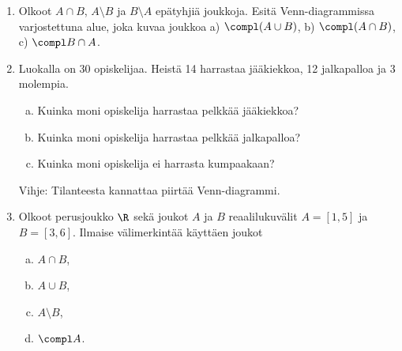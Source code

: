 \begin{enumerate}
%
%
%
%

\item
Olkoot $A \cap B$, $A \setminus B$ ja $B \setminus A$ epätyhjiä joukkoja. Esitä Venn-diagrammissa varjostettuna alue, joka kuvaa joukkoa a) $\compl (A \cup B)$, b) $\compl (A \cap B)$, c) $\compl B \cap A$.

\item Luokalla on 30 opiskelijaa. Heistä 14 harrastaa jääkiekkoa, 12 jalkapalloa ja 3 molempia. 
\begin{enumerate}[a)]
\item Kuinka moni opiskelija harrastaa pelkkää jääkiekkoa?
\item Kuinka moni opiskelija harrastaa pelkkää jalkapalloa?
\item Kuinka moni opiskelija ei harrasta kumpaakaan?
\end{enumerate}
Vihje: Tilanteesta kannattaa piirtää Venn-diagrammi.

\newpage

\item Olkoot perusjoukko $\R$ sekä joukot $A$ ja $B$ reaalilukuvälit $A=[1, 5]$ ja $B=[3, 6]$. Ilmaise välimerkintää käyttäen joukot
\begin{enumerate}[a)]
\item $A \cap B$,
\item $A \cup B$,
\item $A \setminus B$,
\item $\compl A$.
\end{enumerate}


\end{enumerate}
